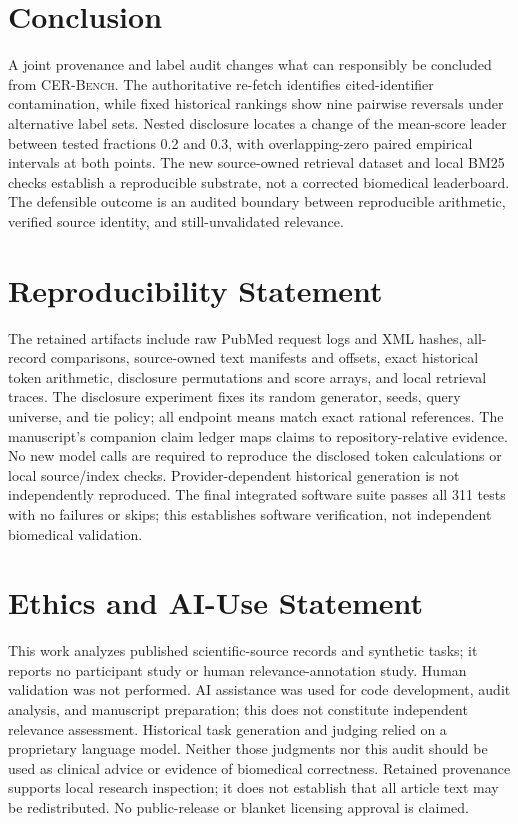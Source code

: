 \documentclass{article}
\newcommand{\cer}{\textsc{CER-Bench}\xspace}
\begin{document}
\section{Conclusion}
A joint provenance and label audit changes what can responsibly be concluded from \cer. The authoritative re-fetch identifies cited-identifier contamination, while fixed historical rankings show nine pairwise reversals under alternative label sets. Nested disclosure locates a change of the mean-score leader between tested fractions 0.2 and 0.3, with overlapping-zero paired empirical intervals at both points. The new source-owned retrieval dataset and local BM25 checks establish a reproducible substrate, not a corrected biomedical leaderboard. The defensible outcome is an audited boundary between reproducible arithmetic, verified source identity, and still-unvalidated relevance.
\label{page:mainend}

\section*{Reproducibility Statement}
The retained artifacts include raw PubMed request logs and XML hashes, all-record comparisons, source-owned text manifests and offsets, exact historical token arithmetic, disclosure permutations and score arrays, and local retrieval traces. The disclosure experiment fixes its random generator, seeds, query universe, and tie policy; all endpoint means match exact rational references. The manuscript's companion claim ledger maps claims to repository-relative evidence. No new model calls are required to reproduce the disclosed token calculations or local source/index checks. Provider-dependent historical generation is not independently reproduced. The final integrated software suite passes all 311 tests with no failures or skips; this establishes software verification, not independent biomedical validation.

\section*{Ethics and AI-Use Statement}
This work analyzes published scientific-source records and synthetic tasks; it reports no participant study or human relevance-annotation study. Human validation was not performed. AI assistance was used for code development, audit analysis, and manuscript preparation; this does not constitute independent relevance assessment. Historical task generation and judging relied on a proprietary language model. Neither those judgments nor this audit should be used as clinical advice or evidence of biomedical correctness. Retained provenance supports local research inspection; it does not establish that all article text may be redistributed. No public-release or blanket licensing approval is claimed.
\end{document}
